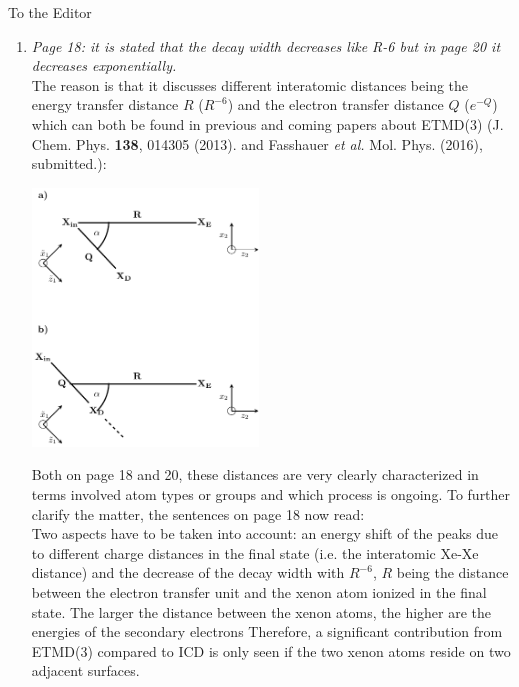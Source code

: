 \documentclass[DIN,pagenumber=false,parskip=half,fromalign=left,fromphone=true,fromemail=true,fromurl=false,fromlogo=false,fromrule=false]{scrlttr2}
\begin{document}
\begin{letter}{To the Editor}
\begin{enumerate}
  \item \emph{Page 18:
        it is stated that the decay width decreases like R-6 but in page 20 it decreases exponentially.}\\
        The reason is that it discusses different interatomic distances being
        the energy transfer distance $R$ ($R^{-6}$) and the electron
        transfer distance $Q$ ($e^{-Q}$) which can both be found in previous and
        coming papers about ETMD(3) (J. Chem. Phys. \textbf{138}, 014305 (2013).
        and Fasshauer \emph{et al.} Mol. Phys. (2016), submitted.):
\begin{center}
 \includegraphics[width=6cm]{../pics/coord_systems.pdf}
\end{center}
        Both on page 18 and 20, these distances are very clearly characterized
        in terms involved atom types or groups and which process is ongoing.
        To further clarify the matter, the sentences on page 18 now read:\\
        Two aspects have to be taken into account: an energy shift of the peaks
        due to different charge distances {\color{blue}{$d$}} in the
        final state (i.e. the interatomic Xe-Xe
        distance) and the decrease of the decay width with $R^{-6}$,
        $R$ being the distance between the electron transfer unit and the xenon
        atom ionized in the final state.
        The larger the distance between the xenon atoms, the higher are the
        energies of the secondary electrons{\color{blue}{. For the case of xenon
        atoms on argon surfaces this at the same time means a larger distance
        between the Ar-Xe pair involved in the electron transfer and the
        electron emitting xenon atom. Hence, the decay widths are smaller.}}
        Therefore, a
        significant contribution from ETMD(3) compared to ICD is only
        seen if the two xenon atoms reside on two adjacent
        surfaces. 


\end{enumerate}
\end{letter}
\end{document}
